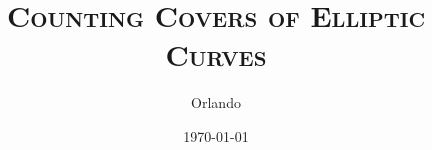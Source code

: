\documentclass[a4paper,10pt,draft]{article}
\title{\textsc{Counting Covers of Elliptic Curves}}
\author{Orlando}
\date{\today}
\begin{document}
\maketitle
\tableofcontents

 \clearpage
 \clearpage
 \clearpage
 \clearpage

{}

\end{document}
